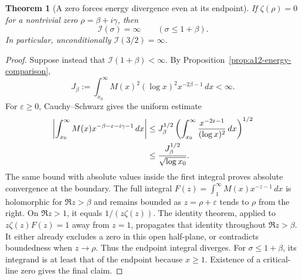 \documentclass[11pt]{amsart}
\numberwithin{equation}{section}
\theoremstyle{plain}
\newtheorem{theorem}{Theorem}[section]
\theoremstyle{definition}
\theoremstyle{remark}
\begin{document}
\begin{theorem}[A zero forces energy divergence even at its endpoint]
\label{thm:a12-energy-zero}
If $\zeta(\rho)=0$ for a nontrivial zero $\rho=\beta+i\gamma$, then
\begin{equation}
\label{eq:a12-energy-zero}
\boxed{\mathcal I(\sigma)=\infty\qquad(\sigma\le1+\beta).}
\end{equation}
In particular, unconditionally $\mathcal I(3/2)=\infty$.
\end{theorem}
\begin{proof}
Suppose instead that $\mathcal I(1+\beta)<\infty$. By
Proposition~\ref{prop:a12-energy-comparison},
\begin{equation}
\label{eq:a12-Jbeta}
J_\beta:=\int_{x_0}^\infty
M(x)^2(\log x)^2x^{-2\beta-1}\,dx<\infty.
\end{equation}
For $\varepsilon\ge0$, Cauchy--Schwarz gives the uniform estimate
\begin{align}
\left|\int_{x_0}^\infty
M(x)x^{-\beta-\varepsilon-i\gamma-1}\,dx\right|
&\le J_\beta^{1/2}
\left(\int_{x_0}^\infty
\frac{x^{-2\varepsilon-1}}{(\log x)^2}\,dx\right)^{1/2}
\notag\\
&\le \frac{J_\beta^{1/2}}{\sqrt{\log x_0}}.
\label{eq:a12-energy-boundary-CS}
\end{align}
The same bound with absolute values inside the first integral proves
absolute convergence at the boundary. The full integral
$F(z)=\int_1^\infty M(x)x^{-z-1}\,dx$ is holomorphic for $\Re z>\beta$
and remains bounded as $z=\rho+\varepsilon$ tends to $\rho$ from the right.
On $\Re z>1$, it equals $1/(z\zeta(z))$. The identity theorem, applied to
$z\zeta(z)F(z)=1$ away from $z=1$, propagates that identity throughout
$\Re z>\beta$. It either already excludes a zero in this open half-plane,
or contradicts boundedness when $z\to\rho$.
Thus the endpoint integral diverges.
For $\sigma\le1+\beta$, its integrand is at least that of the endpoint
because $x\ge1$. Existence of a critical-line zero gives the final claim.
\end{proof}
\end{document}
